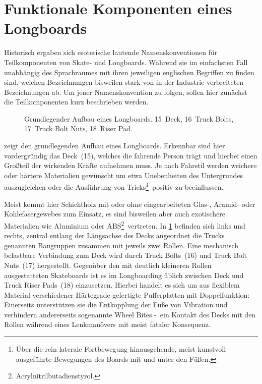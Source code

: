 	\section{Funktionale Komponenten eines Longboards}
		Historisch ergaben sich esoterische lautende Namenskonventionen für Teilkomponenten von Skate- und Longboards.
		Während sie im einfachsten Fall unabhängig des Sprachraumes mit ihren jeweiligen englischen Begriffen zu finden sind, weichen Bezeichnungen bisweilen stark von in der Industrie verbreiteten Bezeichnungen ab.
		Um jener Namenskonvention zu folgen, sollen hier zunächst die Teilkomponenten kurz beschrieben werden.\par\medskip
		\begin{figure}[h]
			\centering
			
			\caption[Grundlegender Aufbau eines Longboards]{Grundlegender Aufbau eines Longboards. 15~Deck, 16~Truck Bolts, 17~Truck Bolt Nuts, 18~Riser Pad.}\label{fig:longboard}
		\end{figure}
		 zeigt den grundlegenden Aufbau eines Longboards.
		Erkennbar sind hier vordergründig das Deck~(15), welches die fahrende Person trägt und hierbei einen Großteil der wirkenden Kräfte aufnehmen muss.
		Je nach Fahrstil werden weichere oder härtere Materialien gewünscht um etwa Unebenheiten des Untergrundes auszugleichen oder die Ausführung von Tricks\footnote{\hspace{1mm} Über die rein laterale Fortbewegung hinausgehende, meist kunstvoll ausgeführte Bewegungen des Boards mit und unter den Füßen.}~positiv zu beeinflussen.

		Meist kommt hier Schichtholz mit oder ohne eingearbeiteten Glas-, Aramid- oder Kohlefasergewebes zum Einsatz, es sind bisweilen aber auch exotischere Materialien wie Aluminium oder ABS\footnote{\hspace{1mm} Acrylnitrilbutadienstyrol.}~vertreten.
		In \cref{fig:longboard} befinden sich links und rechts, zentral entlang der Längsachse des Decks angeordnet die Trucks genannten Baugruppen zusammen mit jeweils zwei Rollen.
		Eine mechanisch belastbare Verbindung zum Deck wird durch Truck Bolts~(16) und Truck Bolt Nuts~(17) hergestellt.
		Gegenüber den mit deutlich kleineren Rollen ausgestatteten Skateboards ist es im Longboarding üblich zwischen Deck und Truck Riser Pads~(18) einzusetzen.
		Hierbei handelt es sich um aus flexiblem Material verschiedener Härtegrade gefertigte Pufferplatten mit Doppelfunktion:
		Einerseits unterstützen sie die Entkopplung der Füße von Vibration und verhindern andererseits sogenannte Wheel Bites -~ein Kontakt des Decks mit den Rollen während eines Lenkmanövers mit meist fataler Konsequenz.

